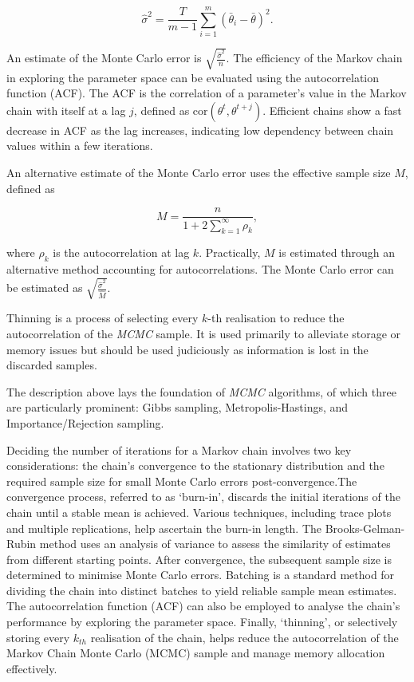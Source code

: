 \documentclass[
  11pt,
]{article}
\begin{document}
\begin{equation}
\hat{\sigma}^2 = \frac{T}{m - 1} \sum_{i=1}^{m}(\bar{\theta}_i - \bar{\theta})^2.
\end{equation}

An estimate of the Monte Carlo error is
\(\sqrt{\frac{\hat{\sigma}^2}{n}}\). The efficiency of the Markov chain
in exploring the parameter space can be evaluated using the
autocorrelation function (ACF). The ACF is the correlation of a
parameter's value in the Markov chain with itself at a lag \(j\),
defined as \(\text{cor}(\theta^t, \theta^{t+j})\). Efficient chains show
a fast decrease in ACF as the lag increases, indicating low dependency
between chain values within a few iterations.

An alternative estimate of the Monte Carlo error uses the effective
sample size \(M\), defined as

\begin{equation}
M = \frac{n}{1 + 2 \sum_{k=1}^{\infty} \rho_k},
\end{equation}

where \(\rho_k\) is the autocorrelation at lag \(k\). Practically, \(M\)
is estimated through an alternative method accounting for
autocorrelations. The Monte Carlo error can be estimated as
\(\sqrt{\frac{\hat{\sigma}^2}{\hat{M}}}\).

Thinning is a process of selecting every \(k\)-th realisation to reduce
the autocorrelation of the \emph{MCMC} sample. It is used primarily to
alleviate storage or memory issues but should be used judiciously as
information is lost in the discarded samples.

The description above lays the foundation of \emph{MCMC} algorithms, of
which three are particularly prominent: Gibbs sampling,
Metropolis-Hastings, and Importance/Rejection sampling.

Deciding the number of iterations for a Markov chain involves two key
considerations: the chain's convergence to the stationary distribution
and the required sample size for small Monte Carlo errors
post-convergence.The convergence process, referred to as `burn-in',
discards the initial iterations of the chain until a stable mean is
achieved. Various techniques, including trace plots and multiple
replications, help ascertain the burn-in length. The Brooks-Gelman-Rubin
method uses an analysis of variance to assess the similarity of
estimates from different starting points. After convergence, the
subsequent sample size is determined to minimise Monte Carlo errors.
Batching is a standard method for dividing the chain into distinct
batches to yield reliable sample mean estimates. The autocorrelation
function (ACF) can also be employed to analyse the chain's performance
by exploring the parameter space. Finally, `thinning', or selectively
storing every \(k_{th}\) realisation of the chain, helps reduce the
autocorrelation of the Markov Chain Monte Carlo (MCMC) sample and manage
memory allocation effectively.
\end{document}
